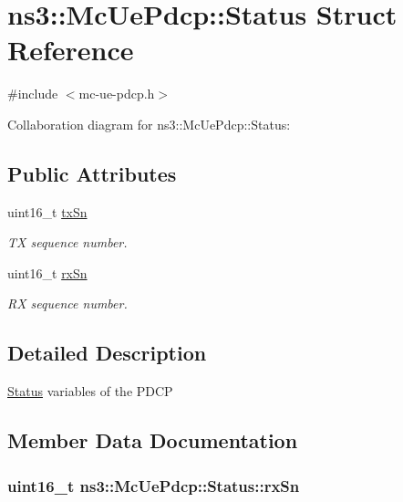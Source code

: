 \hypertarget{structns3_1_1McUePdcp_1_1Status}{}\section{ns3\+:\+:Mc\+Ue\+Pdcp\+:\+:Status Struct Reference}
\label{structns3_1_1McUePdcp_1_1Status}


{\ttfamily \#include $<$mc-\/ue-\/pdcp.\+h$>$}



Collaboration diagram for ns3\+:\+:Mc\+Ue\+Pdcp\+:\+:Status\+:
\subsection*{Public Attributes}
\begin{DoxyCompactItemize}
\item 
uint16\+\_\+t \hyperlink{structns3_1_1McUePdcp_1_1Status_a96787788bbdb4d675de458fe3aa3d72f}{tx\+Sn}
\begin{DoxyCompactList}\small\item\em TX sequence number. \end{DoxyCompactList}\item 
uint16\+\_\+t \hyperlink{structns3_1_1McUePdcp_1_1Status_a5bd3f34643e57f14b12939016e8c1009}{rx\+Sn}
\begin{DoxyCompactList}\small\item\em RX sequence number. \end{DoxyCompactList}\end{DoxyCompactItemize}


\subsection{Detailed Description}
\hyperlink{structns3_1_1McUePdcp_1_1Status}{Status} variables of the P\+D\+CP 

\subsection{Member Data Documentation}
\subsubsection[{\texorpdfstring{rx\+Sn}{rxSn}}]{\setlength{\rightskip}{0pt plus 5cm}uint16\+\_\+t ns3\+::\+Mc\+Ue\+Pdcp\+::\+Status\+::rx\+Sn}\hypertarget{structns3_1_1McUePdcp_1_1Status_a5bd3f34643e57f14b12939016e8c1009}{}\label{structns3_1_1McUePdcp_1_1Status_a5bd3f34643e57f14b12939016e8c1009}


